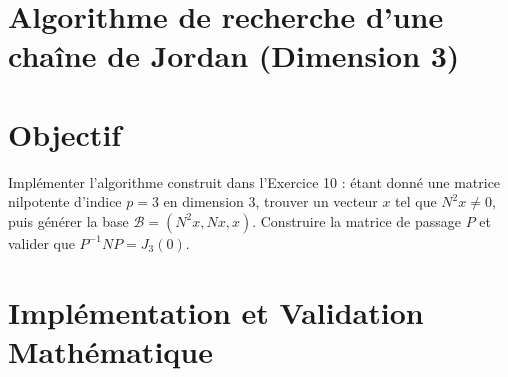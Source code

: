\documentclass[11pt,a4paper]{article}
\begin{document}
\section{Algorithme de recherche d'une chaîne de Jordan (Dimension 3)}

\section{Objectif}
Implémenter l'algorithme construit dans l'Exercice 10 : étant donné une matrice nilpotente d'indice $p=3$ en dimension 3, trouver un vecteur $x$ tel que $N^2 x \neq 0$, puis générer la base $\mathcal{B} = (N^2 x, Nx, x)$.
Construire la matrice de passage $P$ et valider que $P^{-1} N P = J_3(0)$.

\section{Implémentation et Validation Mathématique}
\end{document}

